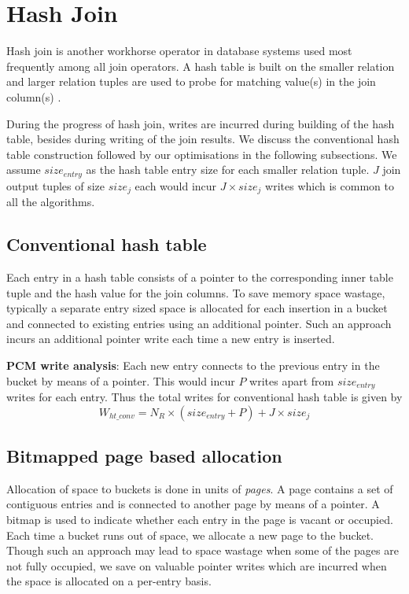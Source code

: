 \section{Hash Join}
\label{hj}

Hash join is another workhorse operator in database systems used most frequently among all join operators. A hash table is built on the smaller relation and larger relation tuples are used to probe for matching value(s) in the join column(s)    .

During the progress of hash join, writes are incurred during building of the hash table, besides during writing of the join results. We discuss the conventional hash table construction followed by our optimisations in the following subsections. We assume $size_{entry}$ as the hash table entry size for each smaller relation tuple. $J$ join output tuples of size $size_{j}$ each would incur $J \times size_{j}$ writes which is common to all the algorithms.

\subsection{Conventional hash table}
Each entry in a hash table consists of a pointer to the corresponding inner table tuple and the hash value for the join columns. To save memory space wastage, typically a separate entry sized space is allocated for each insertion in a bucket and connected to existing entries using an additional pointer. Such an approach incurs an additional pointer write each time a new entry is inserted.

\textbf{PCM write analysis}: Each new entry connects to the previous entry in the bucket by means of a pointer. This would incur $P$ writes apart from $size_{entry}$ writes for each entry. Thus the total writes for conventional hash table is given by
\begin{equation}\label{eq:ht_conv}
  W_{ht\_conv} = N_R \times (size_{entry} + P) + J \times size_{j}
\end{equation}

\subsection{Bitmapped page based allocation}
Allocation of space to buckets is done in units of \textit{pages}. A page contains a set of contiguous entries and is connected to another page by means of a pointer. A bitmap is used to indicate whether each entry in the page is vacant or occupied. Each time a bucket runs out of space, we allocate a new page to the bucket. Though such an approach  may lead to space wastage when some of the pages are not fully occupied, we save on valuable pointer writes which are incurred when the space is allocated on a per-entry basis.

